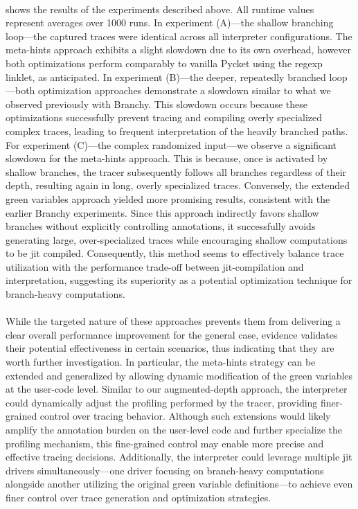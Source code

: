     \paragraph{}%
       shows the results of the experiments described above. All runtime values represent averages over 1000 runs. In experiment (A)—the shallow branching loop—the captured traces were identical across all interpreter configurations. The meta-hints approach exhibits a slight slowdown due to its own overhead, however both optimizations perform comparably to vanilla Pycket using the regexp linklet, as anticipated. In experiment (B)—the deeper, repeatedly branched loop—both optimization approaches demonstrate a slowdown similar to what we observed previously with Branchy. This slowdown occurs because these optimizations successfully prevent tracing and compiling overly specialized complex traces, leading to frequent interpretation of the heavily branched paths. For experiment (C)—the complex randomized input—we observe a significant slowdown for the meta-hints approach. This is because, once  is activated by shallow branches, the tracer subsequently follows all branches regardless of their depth, resulting again in long, overly specialized traces. Conversely, the extended green variables approach yielded more promising results, consistent with the earlier Branchy experiments. Since this approach indirectly favors shallow branches without explicitly controlling  annotations, it successfully avoids generating large, over-specialized traces while encouraging shallow computations to be \gls{jit} compiled. Consequently, this method seems to effectively balance trace utilization with the performance trade-off between \gls{jit}-compilation and interpretation, suggesting its superiority as a potential optimization technique for branch-heavy computations.

    \paragraph{}%
      While the targeted nature of these approaches prevents them from delivering a clear overall performance improvement for the general case, evidence validates their potential effectiveness in certain scenarios, thus indicating that they are worth further investigation. In particular, the meta-hints strategy can be extended and generalized by allowing dynamic modification of the green variables at the user-code level. Similar to our augmented-depth approach, the interpreter could dynamically adjust the profiling performed by the tracer, providing finer-grained control over tracing behavior. Although such extensions would likely amplify the annotation burden on the user-level code and further specialize the profiling mechanism, this fine-grained control may enable more precise and effective tracing decisions. Additionally, the interpreter could leverage multiple \gls{jit} drivers simultaneously—one driver focusing on branch-heavy computations alongside another utilizing the original green variable definitions—to achieve even finer control over trace generation and optimization strategies.

